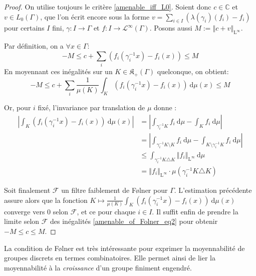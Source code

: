 \documentclass[a4paper,12pt]{article}
\newcommand{\C}{\mathbb{C}}
\newcommand{\norm}[1]{\left\Vert #1\right\Vert}
\newcommand{\abs}[1]{\left\vert#1\right\vert}
\newcommand{\integral}[4]{\int_{#1}^{#2} #3~\mathrm{d}#4}
\newcommand{\inv}{^{-1}}
\newcommand{\TODO}[1]{{\color{red}TODO :} #1}
\begin{document}
\begin{proof}
    On utilise toujours le critère \ref{amenable_iff_L0}. Soient donc $c\in\C$ et $v\in L_0(\Gamma)$, 
    que l'on écrit encore sous la forme $v = \sum_{i\in I} (\lambda(\gamma_i)(f_i) - f_i)$ pour certains $I$ fini, $\gamma : I \to\Gamma$ et
    $f : I\to \mathscr{L}^\infty(\Gamma)$. Posons aussi $M := \norm{c + v}_{\mathrm{L}^\infty}$.

    Par définition, on a $\forall x\in\Gamma$:
    \begin{equation}\label{amenable_of_Folner_eq1}
        -M \le c + \sum_i (f_i(\gamma_i\inv x) - f_i(x)) \le M
    \end{equation}
    En moyennant ces inégalités sur un $K\in\mathfrak{K}_+(\Gamma)$ quelconque, on obtient:
    \begin{equation}\label{amenable_of_Folner_eq2}
        -M \le c + \sum_i \frac1{\mu(K)} \integral{K}{}{\left(f_i(\gamma_i\inv x) - f_i(x)\right)}{\mu(x)} \le M
    \end{equation}

    Or, pour $i$ fixé, l'invariance par translation de $\mu$ donne :
    \begin{align*}
        \abs{\integral{K}{}{(f_i(\gamma_i\inv x) - f_i(x))}{\mu(x)}} 
            &= \abs{\integral{\gamma_i\inv K}{}{f_i}{\mu} - \integral{K}{}{f_i}{\mu}} \\
            &= \abs{\integral{\gamma_i\inv K\setminus K}{}{f_i}{\mu} - \integral{K\setminus\gamma_i\inv K}{}{f_i}{\mu}} \\
            &\le \integral{\gamma_i\inv K\triangle K}{}{\norm{f_i}_{\mathrm{L}^\infty}}{\mu} \\
            &= \norm{f_i}_{\mathrm{L}^\infty} \cdot \mu(\gamma_i\inv K\triangle K)
    \end{align*}
    
    Soit finalement $\mathscr{F}$ un filtre faiblement de F\o{}lner pour $\Gamma$. L'estimation précédente assure alors que
    la fonction $K\mapsto\frac1{\mu(K)} \integral{K}{}{(f_i(\gamma_i\inv x) - f_i(x))}{\mu(x)}$ converge vers $0$
    selon $\mathscr{F}$, et ce pour chaque $i\in I$. Il suffit enfin de prendre la limite selon $\mathscr{F}$ des inégalités \ref{amenable_of_Folner_eq2}
    pour obtenir $-M\le c\le M$. 
\end{proof}

La condition de F\o{}lner est très intéressante pour exprimer la moyennabilité de groupes discrets en termes combinatoires. Elle permet ainsi 
de lier la moyennabilité à la \emph{croissance} d'un groupe finiment engendré. %
\end{document}
